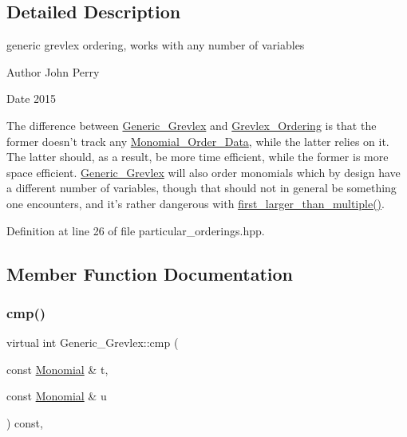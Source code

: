\subsection{Detailed Description}
generic grevlex ordering, works with any number of variables 

\begin{DoxyAuthor}{Author}
John Perry 
\end{DoxyAuthor}
\begin{DoxyDate}{Date}
2015
\end{DoxyDate}
The difference between \hyperlink{class_generic___grevlex}{Generic\+\_\+\+Grevlex} and \hyperlink{class_grevlex___ordering}{Grevlex\+\_\+\+Ordering} is that the former doesn't track any \hyperlink{class_monomial___order___data}{Monomial\+\_\+\+Order\+\_\+\+Data}, while the latter relies on it. The latter should, as a result, be more time efficient, while the former is more space efficient. \hyperlink{class_generic___grevlex}{Generic\+\_\+\+Grevlex} will also order monomials which by design have a different number of variables, though that should not in general be something one encounters, and it's rather dangerous with \hyperlink{class_generic___grevlex_a93cb33a7a2f73152ec1e01d155ad14c9}{first\+\_\+larger\+\_\+than\+\_\+multiple()}. 

Definition at line 26 of file particular\+\_\+orderings.\+hpp.



\subsection{Member Function Documentation}
\mbox{\label{class_generic___grevlex_afb101ce92463ca2fef409237d005bd87}} 
\subsubsection{\texorpdfstring{cmp()}{cmp()}}
{\footnotesize\ttfamily virtual int Generic\+\_\+\+Grevlex\+::cmp (\begin{DoxyParamCaption}\item[{const \hyperlink{class_monomial}{Monomial} \&}]{t,  }\item[{const \hyperlink{class_monomial}{Monomial} \&}]{u }\end{DoxyParamCaption}) const\hspace{0.3cm}{\ttfamily [inline]}, {\ttfamily [virtual]}}



